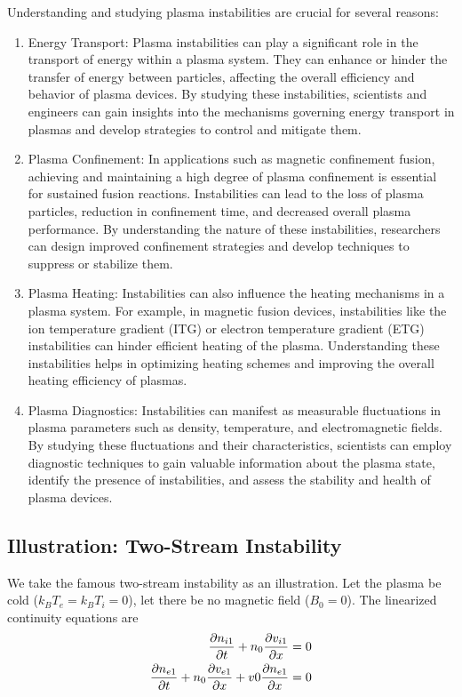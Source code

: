 Understanding and studying plasma instabilities are crucial for several reasons:
\begin{enumerate}
    \item Energy Transport: Plasma instabilities can play a significant role in the transport of energy within a plasma system. They can enhance or hinder the transfer of energy between particles, affecting the overall efficiency and behavior of plasma devices. By studying these instabilities, scientists and engineers can gain insights into the mechanisms governing energy transport in plasmas and develop strategies to control and mitigate them.
    \item Plasma Confinement: In applications such as magnetic confinement fusion, achieving and maintaining a high degree of plasma confinement is essential for sustained fusion reactions. Instabilities can lead to the loss of plasma particles, reduction in confinement time, and decreased overall plasma performance. By understanding the nature of these instabilities, researchers can design improved confinement strategies and develop techniques to suppress or stabilize them.
    \item Plasma Heating: Instabilities can also influence the heating mechanisms in a plasma system. For example, in magnetic fusion devices, instabilities like the ion temperature gradient (ITG) or electron temperature gradient (ETG) instabilities can hinder efficient heating of the plasma. Understanding these instabilities helps in optimizing heating schemes and improving the overall heating efficiency of plasmas.
    \item Plasma Diagnostics: Instabilities can manifest as measurable fluctuations in plasma parameters such as density, temperature, and electromagnetic fields. By studying these fluctuations and their characteristics, scientists can employ diagnostic techniques to gain valuable information about the plasma state, identify the presence of instabilities, and assess the stability and health of plasma devices.
\end{enumerate}

\subsection{Illustration: Two-Stream Instability} \label{sec:two-stream-instability}
We take the famous two-stream instability as an illustration. Let the plasma be cold ($k_BT_e = k_BT_i = 0$), let there be no magnetic field ($B_0=0$). The linearized continuity equations are
\begin{align} 
	\pdv{n_{i1}}{t} + n_0\pdv{v_{i1}}{x} &= 0  \label{eq:two-stream-continuity1} \\
	\pdv{n_{e1}}{t} + n_0\pdv{v_{e1}}{x} + v0\pdv{n_{e1}}{x} &= 0 \label{eq:two-stream-continuity2}
\end{align}

